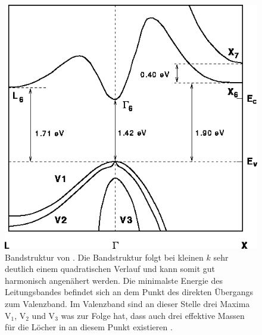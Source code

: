 \begin{figure}[H]
  \centering
  \includegraphics[width = .4\textwidth]{images/Bandstruktur_GaAs.png}
  \caption{Bandstruktur von . Die Bandstruktur folgt bei kleinen $k$ sehr deutlich einem quadratischen Verlauf und kann somit gut harmonisch angenähert werden. Die minimalste Energie des Leitungsbandes befindet sich an dem Punkt des direkten Übergangs zum Valenzband. Im Valenzband sind an dieser Stelle drei Maxima V$_1$, V$_2$ und V$_3$ was zur Folge hat, dass auch drei effektive Massen für die Löcher in  an diesem Punkt existieren \cite{Band_GaAs}.}
  \label{fig:Band_GaAs}
\end{figure}



